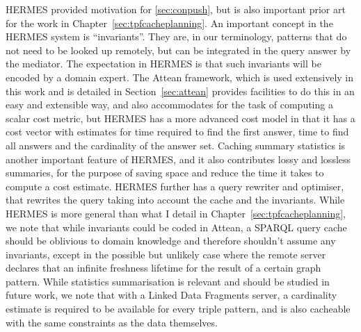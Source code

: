 HERMES \cite{adali1996query} provided motivation for
\ref{sec:conpush}, but is also important prior art for the work in
Chapter~\ref{sec:tpfcacheplanning}. An important concept in the HERMES
system is ``invariants''. They are, in our terminology, patterns that
do not need to be looked up remotely, but can be integrated in the
query answer by the mediator. The expectation in HERMES is that such
invariants will be encoded by a domain expert. The Attean framework,
which is used extensively in this work and is detailed in Section~\ref{sec:attean}
provides facilities to do this in an easy and extensible way, and also
accommodates for the task of computing a scalar cost metric, but
HERMES has a more advanced cost model in that it has a cost vector
with estimates for time required to find the first answer, time to
find all answers and the cardinality of the answer set. Caching
summary statistics is another important feature of HERMES, and it also
contributes lossy and lossless summaries, for the purpose of saving
space and reduce the time it takes to compute a cost estimate. HERMES
further has a query rewriter and optimiser, that rewrites the query
taking into account the cache and the invariants. While HERMES is more
general than what I detail in Chapter~\ref{sec:tpfcacheplanning}, we
note that while invariants could be coded in Attean, a SPARQL query
cache should be oblivious to domain knowledge and therefore shouldn't
assume any invariants, except in the possible but unlikely case where
the remote server declares that an infinite freshness lifetime for the
result of a certain graph pattern. While statistics summarisation is
relevant and should be studied in future work, we note that with a
Linked Data Fragments server, a cardinality estimate is required to be
available for every triple pattern, and is also cacheable with the
same constraints as the data themselves.


